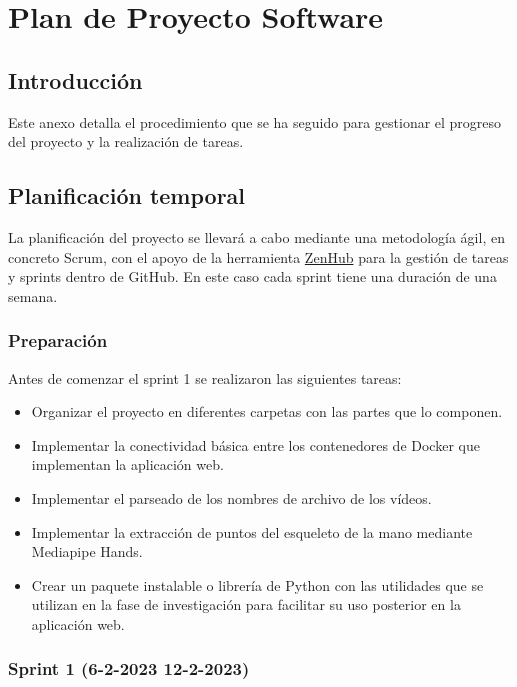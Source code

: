 \chapter{Plan de Proyecto Software}
\label{cha:Plan de Proyecto Software}

\section{Introducción}

Este anexo detalla el procedimiento que se ha seguido para gestionar el progreso
del proyecto y la realización de tareas.

\section{Planificación temporal}

La planificación del proyecto se llevará a cabo mediante una metodología ágil,
en concreto Scrum, con el apoyo de la herramienta
\href{https://www.zenhub.com/}{ZenHub} para la gestión de tareas y sprints
dentro de GitHub. En este caso cada sprint tiene una duración de una semana.

\subsection{Preparación}

Antes de comenzar el sprint 1 se realizaron las siguientes tareas:

\begin{itemize}
    \item Organizar el proyecto en diferentes carpetas con las partes que
          lo componen.
    \item Implementar la conectividad básica entre los contenedores de Docker
          que implementan la aplicación web.
    \item Implementar el parseado de los nombres de archivo de los vídeos.
    \item Implementar la extracción de puntos del esqueleto de la mano mediante
          Mediapipe Hands.
    \item Crear un paquete instalable o librería de Python con las utilidades
          que se utilizan en la fase de investigación para facilitar su uso
          posterior en la aplicación web.
\end{itemize}

\subsection{Sprint 1 (6-2-2023  12-2-2023)}

